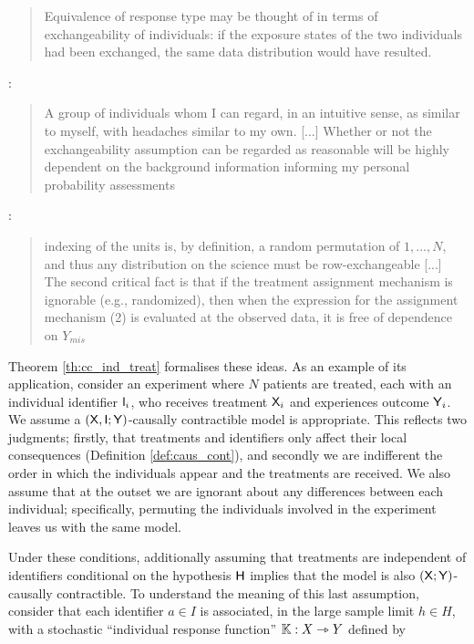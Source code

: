 \begin{quote}
    Equivalence of response type may be thought of in terms of exchangeability of individuals: if the exposure states of the two individuals had been exchanged, the same data distribution would have resulted.
\end{quote}

\citet{dawid_decision-theoretic_2020}:

\begin{quote}
    A group of individuals whom I can regard, in an intuitive sense, as similar to myself, with headaches similar to my own. [...] Whether or not the exchangeability assumption can be regarded as reasonable will be highly dependent on the background information informing my personal probability assessments
\end{quote}

\citet{rubin_causal_2005}:

\begin{quote}
    indexing of the units is, by definition, a random permutation of $1,..., N$, and thus any distribution on the science must be row-exchangeable [...] The second critical fact is that if the treatment assignment mechanism is ignorable (e.g., randomized), then when the expression for the assignment mechanism (2) is evaluated at the observed data, it is free of dependence on $Y_{mis}$
\end{quote}

Theorem \ref{th:cc_ind_treat} formalises these ideas. As an example of its application, consider an experiment where $N$ patients are treated, each with an individual identifier $\mathsf{I}_i$, who receives treatment $\mathsf{X}_i$ and experiences outcome $\mathsf{Y}_i$. We assume a $(\mathsf{X},\mathsf{I};\mathsf{Y})$-causally contractible model is appropriate. This reflects two judgments; firstly, that treatments and identifiers only affect their local consequences (Definition \ref{def:caus_cont}), and secondly we are indifferent the order in which the individuals appear and the treatments are received. We also assume that at the outset we are ignorant about any differences between each individual; specifically, permuting the individuals involved in the experiment leaves us with the same model.

Under these conditions, additionally assuming that treatments are independent of identifiers conditional on the hypothesis $\mathsf{H}$ implies that the model is also $(\mathsf{X};\mathsf{Y})$-causally contractible. To understand the meaning of this last assumption, consider that each identifier $a\in I$ is associated, in the large sample limit $h\in H$, with a stochastic ``individual response function'' $\mathbb{K}: X\rightarrowtriangle Y$ defined by

